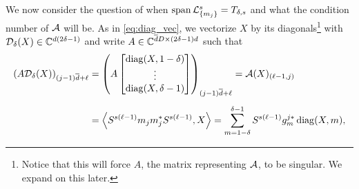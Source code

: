 We now consider the question of when $\operatorname{span} \mathcal{L}_{\{m_j\}}^s = T_{\delta, s}$ and what the condition number of $\mathcal{A}$ will be.  As in \eqref{eq:diag_vec}, we vectorize $X$ by its diagonals\footnote{Notice that this will force $A$, the matrix representing $\mathcal{A}$, to be singular.  We expand on this later.} with $\mathcal{D}_\delta(X) \in \mathbb{C}^{d (2 \delta - 1)}$ and write $A \in \mathbb{C}^{\overline{d} D \times (2 \delta - 1) d}$ such that \begin{align*} \left(A \Dc_\delta(X) \right)_{(j-1) \dbar + \ell} &=  \left(A \colmatfl{\diag(X, 1 - \delta)}{\diag(X, \delta - 1)}\right)_{(j - 1) \dbar + \ell} = \Ac(X)_{(\ell - 1, j)} \\[.5em] &= \inner*{S^{s(\ell - 1)} m_j m_j^* S^{s (\ell - 1)}, X} = \sum_{m = 1 - \delta}^{\delta - 1} S^{s (\ell - 1)} g_m^{j*} \diag(X, m), %
\end{align*}
